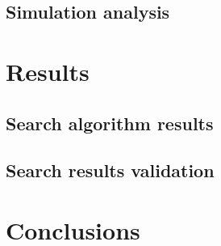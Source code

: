 \documentclass[pdflatex,sn-basic]{sn-jnl}
\begin{document}
	\subsection{Simulation analysis}
	

\section{Results}
	\subsection{Search algorithm results}
	

	\subsection{Search results validation}
	


\section{Conclusions}





\end{document}
